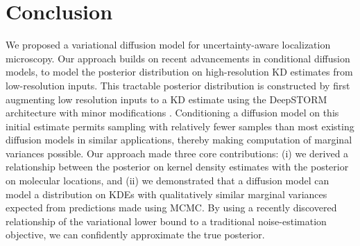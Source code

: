 

\section{Conclusion}

We proposed a variational diffusion model for uncertainty-aware localization microscopy. Our approach builds on recent advancements in conditional diffusion models, to model the posterior distribution on high-resolution KD estimates from low-resolution inputs. This tractable posterior distribution is constructed by first augmenting low resolution inputs to a KD estimate using the DeepSTORM architecture with minor modifications \parencite{Nehme2020}. Conditioning a diffusion model on this initial estimate permits sampling with relatively fewer samples than most existing diffusion models in similar applications, thereby making computation of marginal variances possible. Our approach made three core contributions: (i) we derived a relationship between the posterior on kernel density estimates with the posterior on molecular locations, and (ii) we demonstrated that a diffusion model can model a distribution on KDEs with qualitatively similar marginal variances expected from predictions made using MCMC. By using a recently discovered relationship of the variational lower bound to a traditional noise-estimation objective, we can confidently approximate the true posterior.

